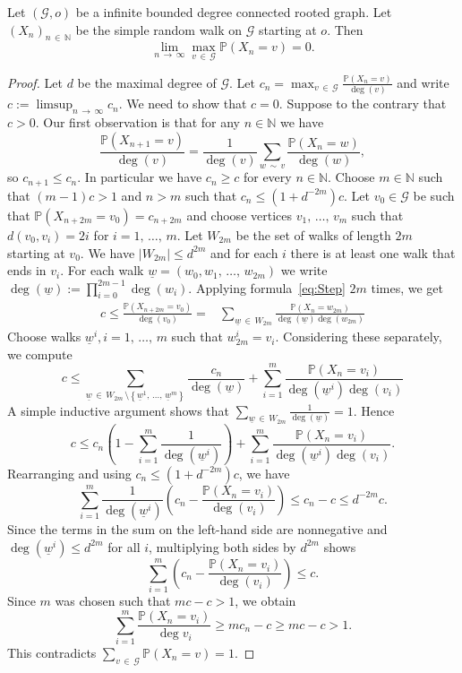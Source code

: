 \documentclass[AHL,Unicode,longabstracts,published]{cedram}
\newcommand{\bbN}{\mathbb{N}}
\newcommand{\bbP}{\mathbb{P}}
\newcommand{\calG}{\mathcal{G}}
\begin{document}
\begin{lemm}\label{lem:ProbDecay}
Let $(\calG,o)$ be a infinite bounded degree connected rooted graph. Let $(X_n)_{n\,\in\,\bbN}$ be the simple random walk on $\calG$ starting at $o$. Then
\[
\displaystyle\lim_{n\,\to\,\infty}\max_{v\,\in\,\calG}\bbP(X_n=v)=0.
\]
\end{lemm}

\begin{proof}
Let $d$ be the maximal degree of $\calG$. Let $c_n=\max_{v\,\in\,\calG}\frac{\bbP(X_n=v)}{\deg(v)}$ and write $c:=\limsup_{n\,\to\,\infty}c_n$. We need to show that $c=0$. Suppose to the contrary that $c>0$. Our first observation is that for any $n\in\bbN$ we have
\begin{equation}\label{eq:Step}
\frac{\bbP(X_{n+1}=v)}{\deg(v)}=\frac{1}{\deg(v)}\sum_{w\,\sim\,v}\frac{\bbP(X_{n}=w)}{\deg(w)},
\end{equation}
so $c_{n+1}\leq c_n$. In particular we have $c_n\geq c$ for every $n\in \bbN$. Choose $m\in\bbN$ such that $(m-1)c > 1$ and $n> m$ such that $c_n\leq (1+d^{-2m})c.$ Let $v_0\in \calG$ be such that $\bbP(X_{n+2m}=v_0)=c_{n+2m}$ and choose vertices $v_1,\,\ldots,\,v_m$ such that $d(v_0,v_i)=2i$ for $i=1,\,\ldots,\,m$. Let $W_{2m}$ be the set of walks of length $2m$ starting at $v_0$. We have $|W_{2m}|\leq d^{2m}$ and for each $i$ there is at least one walk that ends in $v_i$. For each walk $\underline{w}=(w_0,w_1,\,\ldots,\,w_{2m})$ we write $\deg(\underline w):=\prod_{i=0}^{2m-1}\deg(w_i).$ Applying formula~\eqref{eq:Step} $2m$ times, we get
\begin{align*}
c\leq \frac{\bbP(X_{n+2m}=v_0)}{\deg(v_0)}=&\sum_{\underline w\,\in\,W_{2m}} \frac{\bbP(X_n=w_{2m})}{\deg(\underline w)\deg(w_{2m})}
\end{align*}
Choose walks $\underline{w}^i, i=1,\,\ldots,\,m$ such that $w_{2m}^i=v_i$. Considering these separately, we compute
\[
c\leq \sum_{\underline w\,\in\,W_{2m}\,\setminus\left\{\underline w^1,\,\ldots,\,\underline w^m\right\}} \frac{c_n}{\deg(\underline w)}+\sum_{i=1}^m \frac{\bbP(X_n=v_i)}{\deg(\underline{w}^i)\deg(v_i)}
\]
A simple inductive argument shows that $\sum_{\underline w\,\in\,W_{2m}}\frac{1}{\deg(\underline w)}=1$. Hence
\[
c\leq c_n\left(1-\sum_{i=1}^m \frac{1}{\deg(\underline w^i)}\right)+\sum_{i=1}^m \frac{\bbP(X_n=v_i)}{\deg(\underline{w}^i)\deg(v_i)}.
\]
Rearranging and using $c_n\leq (1+d^{-2m})c$, we have
\[
\sum_{i=1}^m\frac{1}{\deg(\underline w^i)}\left(c_n- \frac{\bbP(X_n=v_i)}{\deg(v_i)}\right)\leq c_n-c\leq d^{-2m}c.
\]
Since the terms in the sum on the left-hand side are nonnegative and $\deg(\underline w^i)\leq d^{2m}$ for all $i$, multiplying both sides by $d^{2m}$ shows
\[
\sum_{i=1}^m\left(c_n- \frac{\bbP(X_n=v_i)}{\deg(v_i)}\right)\leq c.
\]
Since $m$ was chosen such that $mc-c>1$, we obtain
\[
\sum_{i=1}^m \frac{\bbP(X_n=v_i)}{\deg v_i} \geq mc_n-c\geq mc-c>1.
\]
This contradicts $\sum_{v\,\in\,\calG} \bbP(X_n=v)=1$.
\end{proof}
\end{document}
